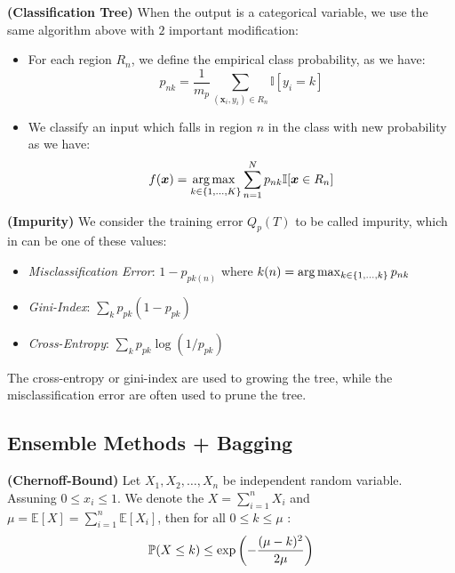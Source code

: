 \begin{definition}{\textbf{(Classification Tree)}}
    When the output is a categorical variable, we use the same algorithm above with $2$ important modification:
    \begin{itemize}
        \item For each region $R_n$, we define the empirical class probability, as we have:
        \begin{equation*}
            p_{nk} = \frac{1}{m_p}\sum_{(\boldsymbol x_i, y_i) \in R_n} \mathbb{I}[y_i=k]
        \end{equation*}
        \item We classify an input which falls in region $n$ in the class with new probability as we have:
        \begin{equation*}
            f(\boldsymbol x) = \underset{k \in \left\{ 1,\dots,K \right\}}{\arg\max \ }\sum^N_{n=1}p_{nk} \mathbb{I}[\boldsymbol x \in R_n]
        \end{equation*}
    \end{itemize}
\end{definition}

\begin{definition}{\textbf{(Impurity)}}
    We consider the training error $Q_p(T)$ to be called impurity, which in can be one of these values:
    \begin{itemize}
        \item \emph{Misclassification Error}: $1 - p_{pk(n)}$ where $k(n) = \arg\max_{k\in\left\{ 1,\dots,k \right\}} p_{nk}$
        \item \emph{Gini-Index}: $\sum_kp_{pk}(1-p_{pk})$
        \item \emph{Cross-Entropy}: $\sum_kp_{pk}\log(1/p_{pk})$
    \end{itemize}
    The cross-entropy or gini-index are used to growing the tree, while the misclassification error are often used to prune the tree. 
\end{definition}

\subsection{Ensemble Methods + Bagging}

\begin{theorem}{\textbf{(Chernoff-Bound)}}
    Let $X_1,X_2,\dots,X_n$ be independent random variable. Assuning $0\le x_i \le 1$. We denote the $X = \sum^n_{i=1}X_i$ and $\mu = \mathbb{E}[X] = \sum^n_{i=1}\mathbb{E}[X_i]$, then for all $0\le k \le \mu$ :
    \begin{equation*}
        \mathbb{P}(X \le k) \le \exp\left( -\frac{(\mu - k)^2}{2\mu} \right)
    \end{equation*}
\end{theorem}

